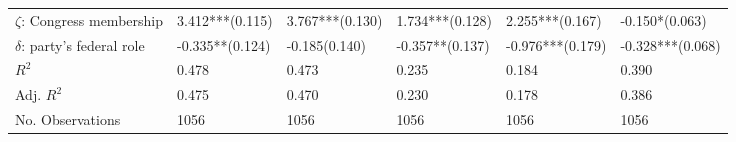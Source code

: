 \begin{table}[h]
\begin{adjustbox}{width=\linewidth, center}
\begin{tabular}{llllll}
	$\zeta$: Congress membership   &                      \phantom{-}3.412***(0.115) &                                \phantom{-}3.767***(0.130) &                                \phantom{-}1.734***(0.128) &                      \phantom{-}2.255***(0.167) &  -0.150*\phantom{*}\phantom{*}(0.063) \\
	$\delta$: party's federal role &                      -0.335**\phantom{*}(0.124) &            -0.185\phantom{*}\phantom{*}\phantom{*}(0.140) &                                -0.357**\phantom{*}(0.137) &                                -0.976***(0.179) &                      -0.328***(0.068) \\
	$R^2$                          &                                           0.478 &                                                     0.473 &                                                     0.235 &                                           0.184 &                                 0.390 \\
	Adj. $R^2$                     &                                           0.475 &                                                     0.470 &                                                     0.230 &                                           0.178 &                                 0.386 \\
	No. Observations               &                                            1056 &                                                      1056 &                                                      1056 &                                            1056 &                                  1056 \\
	\bottomrule
	\end{tabular}
	
\end{adjustbox}
	\end{table}

